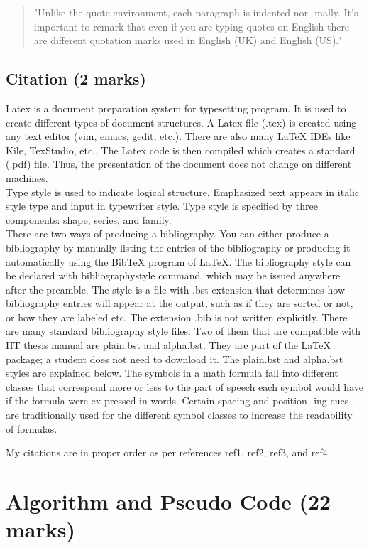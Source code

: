 \documentclass[a4paper, 12pt, fullpage]{article}
\begin{document}
\begin{quote}
"Unlike the quote environment, each paragraph is indented nor- mally.
It’s important to remark that even if you are typing quotes on English
there are different quotation marks used in English (UK) and English
(US)."
\end{quote}

\subsection{Citation (2 marks)}
Latex \cite{first} is a document preparation system for typesetting program. It is used
to create different types of document structures. A Latex file (.tex) is created
using any text editor (vim, emacs, gedit, etc.). There are also many LaTeX
IDEs like Kile, TexStudio, etc.. The Latex code is then compiled which creates
a standard (.pdf) file. Thus, the presentation of the document does not change
on different machines.
\\
Type style\cite{second} is used to indicate logical structure. Emphasized text appears in
italic style type and input in typewriter style. Type style is specified by three
components: shape, series, and family.\\

There are two ways of producing a bibliography\cite{third}. You can either produce
a bibliography by manually listing the entries of the bibliography or producing
it automatically using the BibTeX program of LaTeX. The bibliography style can
be declared with bibliographystyle command, which may be issued anywhere
after the preamble. The style is a file with .bst extension that determines how
bibliography entries will appear at the output, such as if they are sorted or not,
or how they are labeled etc. The extension .bib is not written explicitly. There
are many standard bibliography style files. Two of them that are compatible
with IIT thesis manual are plain.bst and alpha.bst. They are part of the LaTeX
package; a student does not need to download it. The plain.bst and alpha.bst
styles are explained below. The symbols in a math formula fall into different
classes that correspond more or less to the part of speech each symbol would
have if the formula were ex pressed in words. Certain spacing and position-
ing cues are traditionally used for the different symbol classes to increase the
readability of formulas. \cite{fourth}

My citations are in proper order as per references ref1, ref2, ref3, and ref4.
\newpage
\section{Algorithm and Pseudo Code (22 marks)}
\end{document}
